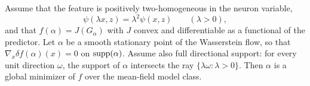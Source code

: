 \begin{prop}\label{prop-formal-chizat-bach}
	Assume that the feature is positively two-homogeneous in the neuron variable,
	\[
		\psi(\lambda x,z)=\lambda^2\psi(x,z)
		\qquad(\lambda>0),
	\]
	and that $f(\alpha)=J(G_\alpha)$ with $J$ convex and differentiable as a functional of the predictor. Let $\alpha$ be a smooth stationary point of the Wasserstein flow, so that $\nabla_x\delta f(\alpha)(x)=0$ on $\operatorname{supp}(\alpha)$. Assume also full directional support: for every unit direction $\omega$, the support of $\alpha$ intersects the ray $\{\lambda\omega:\lambda>0\}$. Then $\alpha$ is a global minimizer of $f$ over the mean-field model class.
\end{prop}
